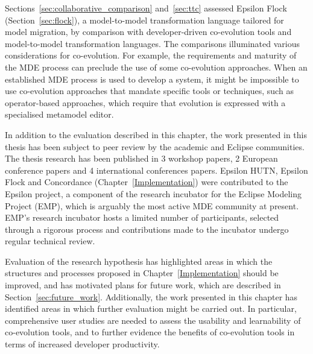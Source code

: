 Sections~\ref{sec:collaborative_comparison} and~\ref{sec:ttc} assessed Epsilon Flock (Section~\ref{sec:flock}), a model-to-model transformation language tailored for model migration, by comparison with developer-driven co-evolution tools and model-to-model transformation languages. The comparisons illuminated various considerations for co-evolution. For example, the requirements and maturity of the MDE process can preclude the use of some co-evolution approaches. When an established MDE process is used to develop a system, it might be impossible to use co-evolution approaches that mandate specific tools or techniques, such as operator-based approaches, which require that evolution is expressed with a specialised metamodel editor.

In addition to the evaluation described in this chapter, the work presented in this thesis has been subject to peer review by the academic and Eclipse communities. The thesis research has been published in 3 workshop papers, 2 European conference papers and 4 international conferences papers. Epsilon HUTN, Epsilon Flock and Concordance (Chapter~\ref{Implementation}) were contributed to the Epsilon project, a component of the research incubator for the Eclipse Modeling Project (EMP), which is arguably the most active MDE community at present. EMP's research incubator hosts a limited number of participants, selected through a rigorous process and contributions made to the incubator undergo regular technical review. 

Evaluation of the research hypothesis has highlighted areas in which the structures and processes proposed in Chapter~\ref{Implementation} should be improved, and has motivated plans for future work, which are described in Section~\ref{sec:future_work}. Additionally, the work presented in this chapter has identified areas in which further evaluation might be carried out. In particular, comprehensive user studies are needed to assess the usability and learnability of co-evolution tools, and to further evidence the benefits of co-evolution tools in terms of increased developer productivity.